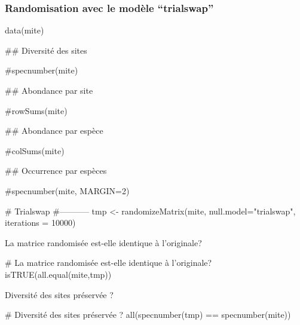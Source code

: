 \documentclass[]{article}
\newenvironment{Shaded}{\begin{snugshade}}{\end{snugshade}}
\newcommand{\KeywordTok}[1]{\textcolor[rgb]{0.94,0.87,0.69}{#1}}
\newcommand{\DataTypeTok}[1]{\textcolor[rgb]{0.87,0.87,0.75}{#1}}
\newcommand{\DecValTok}[1]{\textcolor[rgb]{0.86,0.86,0.80}{#1}}
\newcommand{\StringTok}[1]{\textcolor[rgb]{0.80,0.58,0.58}{#1}}
\newcommand{\CommentTok}[1]{\textcolor[rgb]{0.50,0.62,0.50}{#1}}
\newcommand{\OperatorTok}[1]{\textcolor[rgb]{0.94,0.94,0.82}{#1}}
\newcommand{\NormalTok}[1]{\textcolor[rgb]{0.80,0.80,0.80}{#1}}
\begin{document}
\subsubsection{\texorpdfstring{Randomisation avec le modèle
``trialswap''}{Randomisation avec le modèle trialswap}}\label{randomisation-avec-le-modele-trialswap}

\begin{Shaded}
\begin{Highlighting}[]
\KeywordTok{data}\NormalTok{(mite)}

\NormalTok{## Diversité des sites}

\CommentTok{#specnumber(mite)}

\NormalTok{## Abondance par site}

\CommentTok{#rowSums(mite)}

\NormalTok{## Abondance par espèce}

\CommentTok{#colSums(mite)}

\NormalTok{## Occurrence par espèces}

\CommentTok{#specnumber(mite, MARGIN=2)}

\CommentTok{# Trialswap}
\CommentTok{#-----------}
\NormalTok{tmp <-}\StringTok{ }\KeywordTok{randomizeMatrix}\NormalTok{(mite, }\DataTypeTok{null.model=}\StringTok{"trialswap"}\NormalTok{, }\DataTypeTok{iterations =} \DecValTok{10000}\NormalTok{)}
\end{Highlighting}
\end{Shaded}

La matrice randomisée est-elle identique à l'originale?

\begin{Shaded}
\begin{Highlighting}[]
\CommentTok{# La matrice randomisée est-elle identique à l'originale?}
\KeywordTok{isTRUE}\NormalTok{(}\KeywordTok{all.equal}\NormalTok{(mite,tmp))}
\end{Highlighting}
\end{Shaded}

Diversité des sites préservée ?

\begin{Shaded}
\begin{Highlighting}[]
\CommentTok{# Diversité des sites préservée ?}
\KeywordTok{all}\NormalTok{(}\KeywordTok{specnumber}\NormalTok{(tmp) }\OperatorTok{==}\StringTok{ }\KeywordTok{specnumber}\NormalTok{(mite))}
\end{Highlighting}
\end{Shaded}
\end{document}
